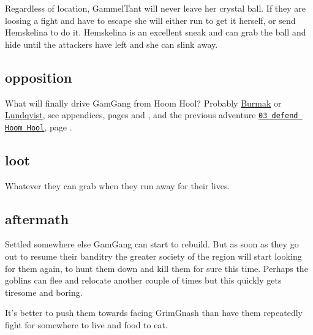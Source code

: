 Regardless of location, GammelTant will never leave her crystal ball. If they are loosing a fight and have to escape she will either run to get it herself, or send Hemskelina to do it. Hemskelina is an excellent sneak and can grab the ball and hide until the attackers have left and she can slink away.


\subsection*{opposition}

What will finally drive GamGang from Hoom Hool? Probably \hyperref[appendixburmak]{Burmak} or \hyperref[appendixlundqvist]{Lundqvist}, see appendices, pages \pageref{appendixburmak} and \pageref{appendixlundqvist}, and the previous adventure \hyperref[03defendhoomhool]{\texttt{03 defend Hoom Hool}}, page \pageref{03defendhoomhool}.


\subsection*{loot}

Whatever they can grab when they run away for their lives.


\subsection*{aftermath}

Settled somewhere else GamGang can start to rebuild. But as soon as they go out to resume their banditry the greater society of the region will start looking for them again, to hunt them down and kill them for sure this time. Perhaps the goblins can flee and relocate another couple of times but this quickly gets tiresome and boring.

It's better to push them towards facing GrimGnash than have them repeatedly fight for somewhere to live and food to eat.













\clearpage
